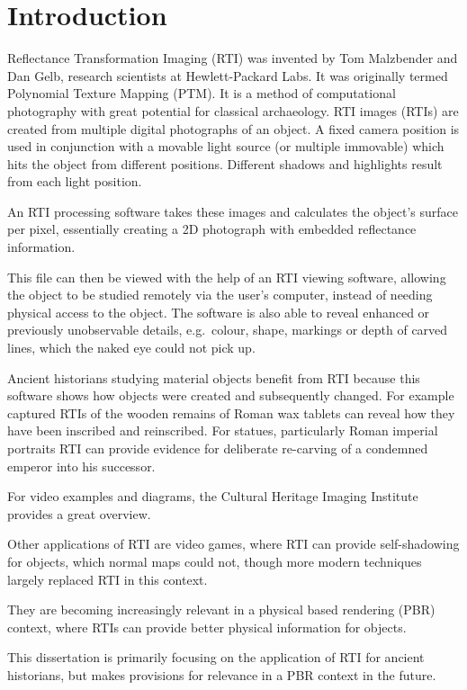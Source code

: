\section{Introduction}
Reflectance Transformation Imaging (RTI) was  invented by Tom Malzbender and Dan
Gelb, research scientists at Hewlett-Packard Labs. It was originally termed
Polynomial Texture Mapping (PTM). It is a method of computational photography
with great potential for classical archaeology. RTI images (RTIs) are created from
multiple digital photographs of an object. A fixed camera position is used in
conjunction with a movable light source (or multiple immovable) which hits the
object from different positions. Different shadows and highlights result from
each light position.

An RTI processing software takes these images and calculates the object's
surface per pixel, essentially creating a 2D photograph with embedded
reflectance information.

This file can then be viewed with the help of an RTI viewing software, allowing
the object to be studied remotely via the user's computer, instead of needing
physical access to the object. The software is also able to reveal enhanced or
previously unobservable details, e.g.\ colour, shape, markings or depth of
carved lines, which the naked eye could not pick up.

Ancient historians studying material objects benefit from RTI because this
software shows how objects were created and subsequently changed. For example
captured RTIs of the wooden remains of Roman wax tablets can reveal how they
have been inscribed and reinscribed. For statues, particularly Roman imperial
portraits RTI can provide evidence for deliberate re-carving of a condemned
emperor into his successor.

For video examples and diagrams, the Cultural Heritage Imaging Institute provides a great overview\cite*{noauthor_cultural_nodate}.

Other applications of RTI are video games, where RTI can provide self-shadowing
for objects, which normal maps could not, though more modern techniques largely
replaced RTI in this context.

They are becoming increasingly relevant in a physical based rendering (PBR) context,
where RTIs can provide better physical information for objects.

This dissertation is primarily focusing on the application of RTI for ancient
historians, but makes provisions for relevance in a PBR context in the future.